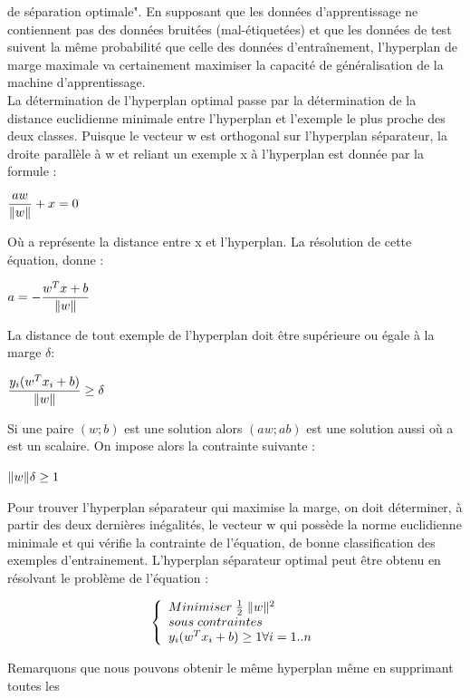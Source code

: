 \documentclass[12pt,a4paper]{report}
\begin{document}
de séparation optimale". En supposant que les données d’apprentissage ne contiennent pas
des données bruitées (mal-étiquetées) et que les données de test suivent la même probabilité
que celle des données d’entraînement, l’hyperplan de marge maximale va certainement
maximiser la capacité de généralisation de la machine d’apprentissage.\\
La détermination de l’hyperplan optimal passe par la détermination de la distance
euclidienne minimale entre l’hyperplan et l’exemple le plus proche des deux classes. Puisque
le vecteur w est orthogonal sur l’hyperplan séparateur, la droite parallèle à w et reliant un
exemple x à l’hyperplan est donnée par la formule :\begin{center}
	$ \dfrac{aw}{\Arrowvert w \Arrowvert}	+ x = 0 $
\end{center}
Où a représente la distance entre x et l’hyperplan. La résolution de cette équation, donne :\begin{center}
	$ a = -\dfrac{w^{T} x + b}{\Arrowvert w \Arrowvert} $

\end{center}
La distance de tout exemple de l’hyperplan doit être supérieure ou égale à la marge $ \delta  $:
\begin{center}
	$ \dfrac{y_{i}(w^{T} x_{i} + b)}{\Arrowvert w \Arrowvert}\geq\delta $
\end{center}
Si une paire $ (w; b) $ est une solution alors $ (aw; ab) $ est une solution aussi où a est un scalaire.
On impose alors la contrainte suivante :\begin{center}
	$ \Arrowvert w \Arrowvert \delta \geq 1 $
\end{center}
Pour trouver l’hyperplan séparateur qui maximise la marge, on doit déterminer, à partir
des deux dernières inégalités, le vecteur w qui possède la norme euclidienne minimale et
qui vérifie la contrainte de l’équation, de bonne classification des exemples d’entrainement.
L’hyperplan séparateur optimal peut être obtenu en résolvant le problème de l’équation :\begin{center}
	$$
	\left\{\begin{array}{l}
		 Minimiser\; \frac{1}{2} \;\Arrowvert w \Arrowvert^{2} \\
		 sous\; contraintes\\
		 y_{i}(w^{T} x_{i} + b) \geq 1 \forall i = 1..n
	\end{array}\right.
	$$
\end{center}
Remarquons que nous pouvons obtenir le même hyperplan même en supprimant toutes les
\end{document}
